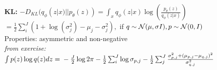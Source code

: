 \textbf{KL:} $-D_{KL}(q_\phi(z|x) || p_\theta(z)) = \int_x q_\phi(z|x) \log(\frac{p_\theta(z)}{q_\phi(z|x)})$\\
$= \frac{1}{2} \sum^J_i (1+ \log(\sigma_j^2) - \mu_j - \sigma_j^2),$ if $q \sim \mathcal{N}(\mu, \sigma I), p \sim \mathcal{N}(0,I)$\\
Properties: asymmetric and non-negative\\
\textit{from exercise:} $\int p(z) \log q(z)dz = \\
- \frac{J}{2} \log 2\pi - \frac{1}{2} \sum_i^J \log \sigma_{p,j} - \frac{1}{2} \sum_j^J \frac{\sigma^2_{p,j} + (\mu_{p,j} - \mu_{q,j})^2}{\sigma^2_{q,j}}$\\

